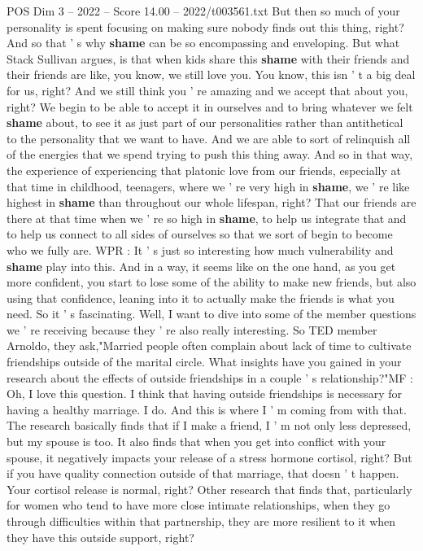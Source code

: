 \begin{textsample}{POS Dim 3 – 2022 – Score 14.00 – 2022/t003561.txt}
But then so much of your personality is spent focusing on making sure nobody finds out this thing, right?
And so that ' s why \textbf{shame} can be so encompassing and enveloping.
But what Stack Sullivan argues, is that when kids share this \textbf{shame} with their friends and their friends are like, you know, we still love you.
You know, this isn ' t a big deal for us, right?
And we still think you ' re amazing and we accept that about you, right?
We begin to be able to accept it in ourselves and to bring whatever we felt \textbf{shame} about, to see it as just part of our personalities rather than antithetical to the personality that we want to have.
And we are able to sort of relinquish all of the energies that we spend trying to push this thing away.
And so in that way, the experience of experiencing that platonic love from our friends, especially at that time in childhood, teenagers, where we ' re very high in \textbf{shame}, we ' re like highest in \textbf{shame} than throughout our whole lifespan, right?
That our friends are there at that time when we ' re so high in \textbf{shame}, to help us integrate that and to help us connect to all sides of ourselves so that we sort of begin to become who we fully are.
WPR : It ' s just so interesting how much vulnerability and \textbf{shame} play into this.
And in a way, it seems like on the one hand, as you get more confident, you start to lose some of the ability to make new friends, but also using that confidence, leaning into it to actually make the friends is what you need.
So it ' s fascinating.
Well, I want to dive into some of the member questions we ' re receiving because they ' re also really interesting.
So TED member Arnoldo, they ask,"Married people often complain about lack of time to cultivate friendships outside of the marital circle.
What insights have you gained in your research about the effects of outside friendships in a couple ' s relationship?"MF : Oh, I love this question.
I think that having outside friendships is necessary for having a healthy marriage.
I do.
And this is where I ' m coming from with that.
The research basically finds that if I make a friend, I ' m not only less depressed, but my spouse is too.
It also finds that when you get into conflict with your spouse, it negatively impacts your release of a stress hormone cortisol, right?
But if you have quality connection outside of that marriage, that doesn ' t happen.
Your cortisol release is normal, right?
Other research that finds that, particularly for women who tend to have more close intimate relationships, when they go through difficulties within that partnership, they are more resilient to it when they have this outside support, right?

\end{textsample}
